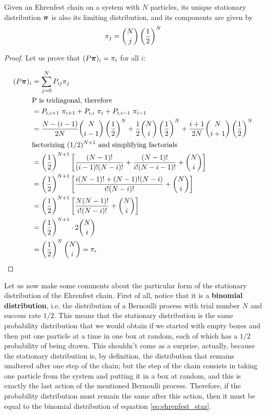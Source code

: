\begin{theorem}
    Given an Ehrenfest chain on a system with $N$ particles, its unique stationary distribution $\boldsymbol{\pi}$ is also its limiting distribution, and its components are given by
    \begin{equation} \label{eq:ehrenfest_staz}
        \pi_j = {{N} \choose {j}} \left(\frac{1}{2} \right)^{N}
    \end{equation}
\end{theorem}
\begin{proof}
    Let us prove that $(P \boldsymbol{\pi})_i =\pi_i$ for all $i$:

        \begin{align}
            (P \boldsymbol{\pi})_i 
            & =  \sum_{j = 0}^N P_{ij} \pi_j \\
            & \text{P is tridiagonal, therefore} \\ 
            & = P_{i,i+1}~\pi_{i+1} + P_{i,i}~\pi_i + P_{i,i-1}~\pi_{i-1}\\
            & = \frac{N-(i-1)}{2N} {{N} \choose {i-1}} \left(\frac{1}{2} \right)^{N} + \frac{1}{2} {{N} \choose {i}} \left(\frac{1}{2} \right)^{N} + \frac{i+1}{2N} {{N} \choose {i+1}} \left(\frac{1}{2} \right)^{N} \\
            & \text{factorizing $(1/2)^{N+1}$ and simplifying factorials} \\
            & = \left(\frac{1}{2} \right)^{N+1} \left[ \frac{(N-1)!}{(i-1)! (N-i)!} + \frac{(N-1)!}{i! (N-i-1)!} + {{N} \choose {i}} \right]\\
            & = \left(\frac{1}{2} \right)^{N+1} \left[ \frac{i (N-1)! + (N-1)! (N-i)}{i! (N-i)!} + {{N} \choose {i}} \right] \\
            & = \left(\frac{1}{2} \right)^{N+1} \left[ \frac{N (N-1)!}{i! (N-i)!} + {{N} \choose {i}} \right] \\
            & = \left(\frac{1}{2} \right)^{N+1} \cdot 2 {{N} \choose {i}}\\
            & = \left(\frac{1}{2} \right)^{N} {{N} \choose {i}} = \pi_i 
        \end{align}
\end{proof}


Let us now make some comments about the particular form of the stationary distribution of the Ehrenfest chain. First of all, notice that it is a \textbf{binomial distribution}, i.e. the distribution of a Bernoulli process with trial number $N$ and success rate $1/2$. This means that the stationary distribution is the same probability distribution that we would obtain if we started with empty boxes and then put one particle at a time in one box at random, each of which has a $1/2$ probability of being drawn. This shouldn't come as a surprise, actually, because the stationary distribution is, by definition, the distribution that remains unaltered after one step of the chain; but the step of the chain consists in taking one particle from the system and putting it in a box at random, and this is exactly the last action of the mentioned Bernoulli process. Therefore, if the probability distribution must remain the same after this action, then it must be equal to the binomial distribution of equation \ref{eq:ehrenfest_staz}.

